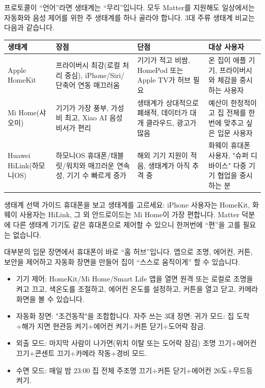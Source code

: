 
프로토콜이 “언어”라면 생태계는 “무리”입니다. 모두 Matter를 지원해도 일상에서는 자동화와 음성 제어를 위한 주 생태계를 하나 골라야 합니다. 3대 주류 생태계 비교는 다음과 같습니다.

\begin{center}
\begin{tabularx}{\linewidth}{|X|X|X|X|}
\hline
\textbf{생태계} & \textbf{장점} & \textbf{단점} & \textbf{대상 사용자} \tabularnewline
\hline
Apple HomeKit & 프라이버시 최강(로컬 처리 중심), iPhone/Siri/단축어 연동 매끄러움 & 기기가 적고 비쌈, HomePod 또는 Apple TV가 허브 필요 & 온 집이 애플 기기, 프라이버시와 체감을 중시하는 사용자 \tabularnewline
Mi Home(샤오미) & 기기가 가장 풍부, 가성비 최고, Xiao AI 음성 비서가 편리 & 생태계가 상대적으로 폐쇄적, 데이터가 대개 클라우드, 광고가 많음 & 예산이 한정적이고 집 전체를 한 번에 맞추고 싶은 입문 사용자 \tabularnewline
Huawei HiLink(하모니OS) & 하모니OS 휴대폰/태블릿/워치와 매끄러운 연속성, 기기 수 빠르게 증가 & 해외 기기 지원이 적음, 생태계가 아직 추격 중 & 화웨이 휴대폰 사용자, "슈퍼 디바이스" 다중 기기 협업을 중시하는 분 \tabularnewline
\hline
\end{tabularx}
\end{center}

\begin{tcbinfo}{생태계 선택 가이드}
휴대폰을 보고 생태계를 고르세요: iPhone 사용자는 HomeKit, 화웨이 사용자는 HiLink, 그 외 안드로이드는 Mi Home이 가장 편합니다. Matter 덕분에 다른 생태계 기기도 같은 휴대폰으로 제어할 수 있으니 한꺼번에 “편”을 고를 필요는 없습니다.

\end{tcbinfo}


대부분의 입문 장면에서 휴대폰이 바로 “홈 허브”입니다. 앱으로 조명, 에어컨, 커튼, 보안을 제어하고 자동화 장면을 만들어 집이 “스스로 움직이게” 할 수 있습니다.

\begin{itemize}
  \item 기기 제어: HomeKit/Mi Home/Smart Life 앱을 열면 원격 또는 로컬로 조명을 켜고 끄고, 색온도를 조절하고, 에어컨 온도를 설정하고, 커튼을 열고 닫고, 카메라 화면을 볼 수 있습니다.
  \item 자동화 장면: "조건동작"을 조합합니다. 자주 쓰는 3대 장면: 귀가 모드: 집 도착+해가 지면 현관등 켜기+에어컨 켜기+커튼 닫기+도어락 잠금.
  \item 외출 모드: 마지막 사람이 나가면(위치 이탈 또는 도어락 잠김) 조명 끄기+에어컨 끄기+콘센트 끄기+카메라 작동+경비 모드.
  \item 수면 모드: 매일 밤 23:00 집 전체 주조명 끄기+커튼 닫기+에어컨 26도+무드등 켜기.
\end{itemize}


